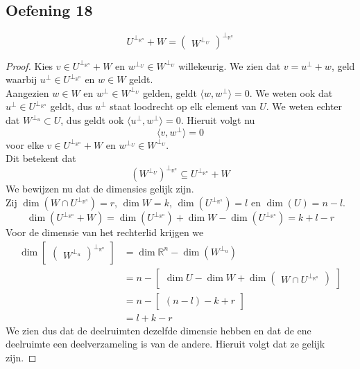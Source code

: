 \documentclass[lineaire_algebra_oplossingen.tex]{subfiles}
\begin{document}
\subsection{Oefening 18}
\label{oef:6.18}
\[U^{\bot_{\mathbb{R}^n}} + W = \begin{pmatrix} W^{\bot_U} \end{pmatrix}^{\bot_{\mathbb{R}^n}}\]
\begin{proof}
Kies $v \in U^{\bot_{\mathbb{R}^n}} + W$ en $w^{\bot_U} \in W^{\bot_U}$ willekeurig. We zien dat $v = u^{\bot} + w$, geld waarbij $u^{\bot} \in U^{\bot_{\mathbb{R}^n}}$ en $w \in W$ geldt.\\
Aangezien $w \in W$ en $w^{\bot} \in W^{\bot_U}$ gelden, geldt $\langle w, w^{\bot} \rangle = 0$. We weten ook dat $u^{\bot} \in U^{\bot_{\mathbb{R}^n}}$ geldt, dus $u^{\bot}$ staat loodrecht op elk element van $U$. We weten echter dat $W^{\bot_u} \subset U$, dus geldt ook $\langle u^{\bot}, w^{\bot} \rangle = 0$. Hieruit volgt nu
\[
\langle v, w^{\bot} \rangle = 0
\]
voor elke $v \in U^{\bot_{\mathbb{R}^n}} + W$ en $w^{\bot_U} \in W^{\bot_U}$.\\
Dit betekent dat
\[
(W^{\bot_U})^{\bot_{\mathbb{R}^n}} \subseteq U^{\bot_{\mathbb{R}^n}} + W
\]
We bewijzen nu dat de dimensies gelijk zijn.\\
Zij $\dim(W \cap U^{\bot_{\mathbb{R}^n}}) = r$, $\dim W = k$, $\dim(U^{\bot_{\mathbb{R}^n}}) = l$ en $\dim(U) = n - l$.
\[
\dim(U^{\bot_{\mathbb{R}^n}} + W) = \dim(U^{\bot_{\mathbb{R}^n}}) + \dim W - \dim(U^{\bot_{\mathbb{R}^n}}) = k + l - r
\]
Voor de dimensie van het rechterlid krijgen we
\begin{align*}
\dim \begin{bmatrix} \begin{pmatrix} W^{\bot_u} \end{pmatrix}^{\bot_{\mathbb{R}^n}} \end{bmatrix}
&= \dim \mathbb{R}^n - \dim(W^{\bot_u}) \\
&= n - \begin{bmatrix} \dim U - \dim W + \dim \begin{pmatrix} W \cap U^{\bot_{\mathbb{R}^n}} \end{pmatrix} \end{bmatrix} \\
&= n - \begin{bmatrix} (n - l) - k + r \end{bmatrix} \\
&= l + k - r
\end{align*}
We zien dus dat de deelruimten dezelfde dimensie hebben en dat de ene deelruimte een deelverzameling is van de andere. Hieruit volgt dat ze gelijk zijn.
\end{proof}
\end{document}
